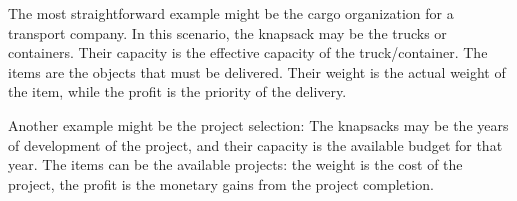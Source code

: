 The most straightforward example might be the cargo organization for a transport company.
In this scenario, the knapsack may be the trucks or containers.
Their capacity is the effective capacity of the truck/container.
The items are the objects that must be delivered.
Their weight is the actual weight of the item, while the profit is the priority of the delivery.

Another example might be the project selection:
The knapsacks may be the years of development of the project, and their capacity is the available budget for
that year.
The items can be the available projects: the weight is the cost of the project, the profit is the monetary gains
from the project completion.